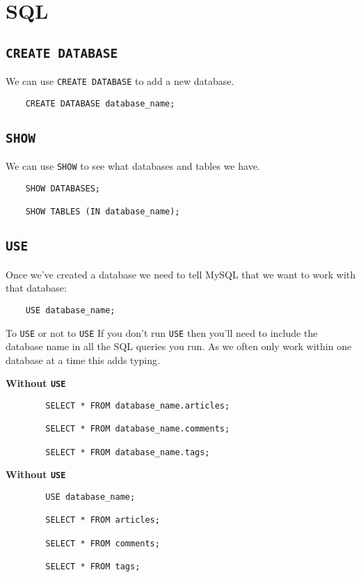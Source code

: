 \section{SQL}

\subsection{\texttt{CREATE DATABASE}}

We can use \texttt{CREATE DATABASE} to add a new database.

\begin{verbatim}
    CREATE DATABASE database_name;
\end{verbatim}

\subsection{\texttt{SHOW}}

We can use \texttt{SHOW} to see what databases and tables we have.

\begin{verbatim}
    SHOW DATABASES;

    SHOW TABLES (IN database_name);
\end{verbatim}

\subsection{\texttt{USE}}

Once we've created a database we need to tell MySQL that we want to work with that database:

\begin{verbatim}
    USE database_name;
\end{verbatim}

\begin{infobox}{To \texttt{USE} or not to \texttt{USE}}
    If you don't run \texttt{USE} then you'll need to include the database name in all the SQL queries you run. As we often only work within one database at a time this adds typing.

    \textbf{Without \texttt{USE}}
    \begin{verbatim}
        SELECT * FROM database_name.articles;

        SELECT * FROM database_name.comments;

        SELECT * FROM database_name.tags;

    \end{verbatim}

    \textbf{Without \texttt{USE}}

    \begin{verbatim}
        USE database_name;

        SELECT * FROM articles;

        SELECT * FROM comments;

        SELECT * FROM tags;
    \end{verbatim}
\end{infobox}


